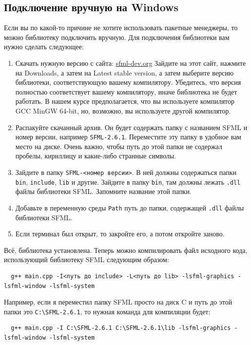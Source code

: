 \documentclass{article}
\begin{document}
\subsection*{Подключение вручную на Windows}
Если вы по какой-то причине не хотите использовать пакетные менеджеры, то можно библиотеку подключить вручную. Для подключения библиотеки вам нужно сделать следующее:

\begin{enumerate}
\item Скачать нужную версию с сайта: \href{https://www.sfml-dev.org/}{sfml-dev.org} Зайдите на этот сайт, нажмите на Downloads, а затем на Latest stable version, а затем выберите версию библиотеки, соответствующую вашему компилятору. Убедитесь, что версия полностью соответствует вашему компилятору, иначе библиотека не будет работать. В нашем курсе предполагается, что вы используете компилятор GCC MinGW 64-bit, но, возможно, вы используете другой компилятор.

\item Распакуйте скачанный архив. Он будет содержать папку с названием SFML и номер версии, например \texttt{SFML-2.6.1}. Переместите эту папку в удобное вам место на диске. Очень важно, чтобы путь до этой папки не содержал пробелы, кириллицу и какие-либо странные символы.

\item Зайдите в папку \texttt{SFML-<номер версии>}. В ней должны содержаться папки \texttt{bin}, \texttt{include}, \texttt{lib} и другие. Зайдите в папку \texttt{bin}, там должны лежать \texttt{.dll} файлы библиотеки SFML. Запомните название этой папки.

\item Добавьте в переменную среды \texttt{Path} путь до папки, содержащей \texttt{.dll} файлы библиотеки SFML.

\item Если терминал был открыт, то закройте его, а потом откройте заново.
\end{enumerate}
Всё, библиотека установлена. Теперь можно компилировать файл исходного кода, использующий библиотеку SFML следующим образом:
\begin{verbatim}
  g++ main.cpp -I<путь до include> -L<путь до lib> -lsfml-graphics -lsfml-window -lsfml-system
\end{verbatim}
Например, если я переместил папку SFML просто на диск C и путь до этой папки это \texttt{C:\textbackslash SFML-2.6.1}, то нужная команда для компиляции будет:
\begin{verbatim}
  g++ main.cpp -I C:\SFML-2.6.1 C:\SFML-2.6.1\lib -lsfml-graphics -lsfml-window -lsfml-system
\end{verbatim}
\end{document}

